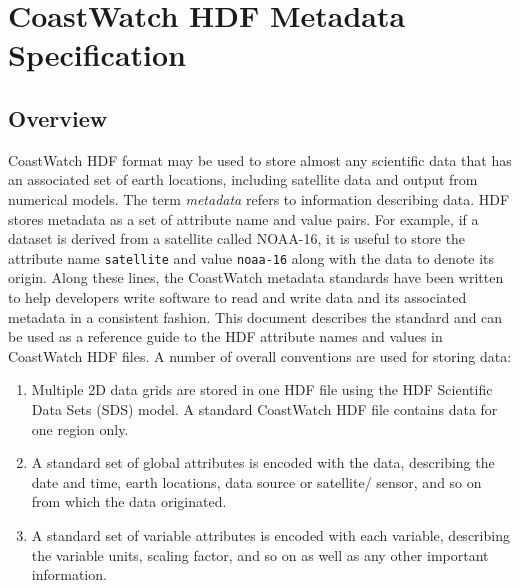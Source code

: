 \chapter{CoastWatch HDF Metadata Specification}
\label{metadata}

\section{Overview}

CoastWatch HDF format may be used to store almost any scientific data
that has an associated set of earth locations, including satellite
data and output from numerical models. The term {\em metadata} refers
to information describing data.  HDF stores metadata as a set of
attribute name and value pairs. For example, if a dataset is derived
from a satellite called NOAA-16, it is useful to store the attribute
name {\tt satellite} and value {\tt noaa-16} along with the data to
denote its origin. Along these lines, the CoastWatch metadata
standards have been written to help developers write software to read
and write data and its associated metadata in a consistent
fashion. This document describes the standard and can be used as a
reference guide to the HDF attribute names and values in CoastWatch
HDF files. A number of overall conventions are used for storing data:
\begin{enumerate}

  \item Multiple 2D data grids are stored in one HDF file using the
  HDF Scientific Data Sets (SDS) model. A standard CoastWatch HDF file
  contains data for one region only.

  \item A standard set of global attributes is encoded with the data,
  describing the date and time, earth locations, data source or
  satellite/ sensor, and so on from which the data originated.

  \item A standard set of variable attributes is encoded with each
  variable, describing the variable units, scaling factor, and so on
  as well as any other important information.

\end{enumerate}

